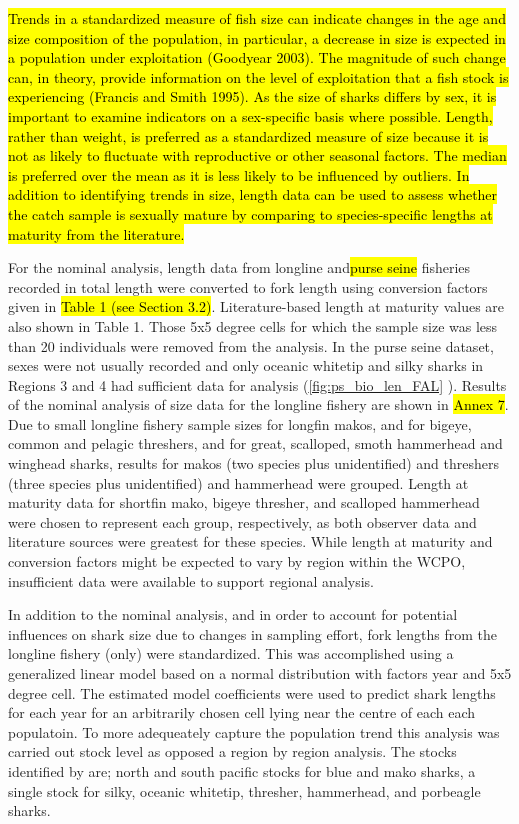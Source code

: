 \documentclass[12pt]{SCreport}
\begin{document}
\hl{Trends in a standardized measure of fish size can indicate changes in the age and size composition of the population, in particular, a decrease in size is expected in a population under exploitation (Goodyear 2003). The magnitude of such change can, in theory, provide information on the level of exploitation that a fish stock is experiencing (Francis and Smith 1995). As the size of sharks differs by sex, it is important to examine indicators on a sex-specific basis where possible. Length, rather than weight, is preferred as a standardized measure of size because it is not as likely to fluctuate with reproductive or other seasonal factors. The median is preferred over the mean as it is less likely to be influenced by outliers. In addition to identifying trends in size, length data can be used to assess whether the catch sample is sexually mature by comparing to species-specific lengths at maturity from the literature.}

For the nominal analysis, length data from   longline and\hl{purse seine }fisheries recorded in total length were converted to fork length using conversion factors given in \hl{ Table 1 (see Section 3.2)}. Literature-based length at maturity values are also shown in Table 1. Those 5x5 degree cells for which the sample size was less than 20 individuals were removed from the analysis. In the purse seine dataset, sexes were not usually recorded and only oceanic whitetip and silky sharks in Regions 3 and 4 had sufficient data for analysis (\ref{fig:ps_bio_len_FAL} ). Results of the nominal analysis of size data for the longline fishery are shown in \hl{Annex 7}.%
Due to small longline fishery sample sizes for longfin makos, and for bigeye, common and pelagic threshers, and for great, scalloped, smoth hammerhead and winghead sharks, results for makos (two species plus unidentified) and threshers (three species plus unidentified) and hammerhead were grouped. Length at maturity data for shortfin mako, bigeye thresher, and scalloped hammerhead were chosen to represent each group, respectively, as both observer data and literature sources were greatest for these species. While length at maturity and conversion factors might be expected to vary by region within the WCPO, insufficient data were available to support regional analysis.


In addition to the nominal analysis, and in order to account for potential influences on shark size due to changes in sampling effort, fork lengths from the longline fishery (only) were standardized. This was accomplished using a generalized linear model based on a normal distribution with factors year and 5x5 degree cell. The estimated model coefficients were used to predict shark lengths for each year for an arbitrarily chosen cell lying near the centre of each each populatoin. To more adequeately capture the population trend this analysis was carried out  stock  level as opposed a region by region analysis. The stocks identified by   are; north and south pacific stocks for blue and mako sharks, a single stock for silky,  oceanic whitetip, thresher, hammerhead, and porbeagle sharks.
\end{document}
